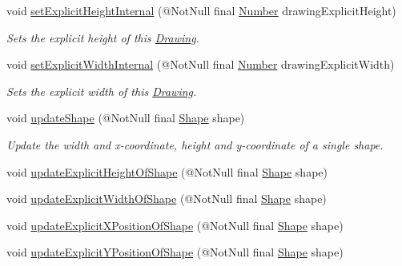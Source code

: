 \begin{DoxyCompactItemize}
void \hyperlink{classcom_1_1aarrelaakso_1_1drawl_1_1_drawing_a54f9447ef03b883cac2bf4535e777a7a}{set\+Explicit\+Height\+Internal} (@Not\+Null final \hyperlink{interfacecom_1_1aarrelaakso_1_1drawl_1_1_number}{Number} drawing\+Explicit\+Height)
\begin{DoxyCompactList}\small\item\em Sets the explicit height of this \hyperlink{classcom_1_1aarrelaakso_1_1drawl_1_1_drawing}{Drawing}. \end{DoxyCompactList}\item 
void \hyperlink{classcom_1_1aarrelaakso_1_1drawl_1_1_drawing_a7083d7046d42a99050495007854b5908}{set\+Explicit\+Width\+Internal} (@Not\+Null final \hyperlink{interfacecom_1_1aarrelaakso_1_1drawl_1_1_number}{Number} drawing\+Explicit\+Width)
\begin{DoxyCompactList}\small\item\em Sets the explicit width of this \hyperlink{classcom_1_1aarrelaakso_1_1drawl_1_1_drawing}{Drawing}. \end{DoxyCompactList}\item 
void \hyperlink{classcom_1_1aarrelaakso_1_1drawl_1_1_drawing_aa60d355859fa4dc21d2670aced9ee927}{update\+Shape} (@Not\+Null final \hyperlink{classcom_1_1aarrelaakso_1_1drawl_1_1_shape}{Shape} shape)
\begin{DoxyCompactList}\small\item\em Update the width and x-\/coordinate, height and y-\/coordinate of a single shape. \end{DoxyCompactList}\item 
void \hyperlink{classcom_1_1aarrelaakso_1_1drawl_1_1_drawing_ab55b53c2e069f28185865f5cf677c8cd}{update\+Explicit\+Height\+Of\+Shape} (@Not\+Null final \hyperlink{classcom_1_1aarrelaakso_1_1drawl_1_1_shape}{Shape} shape)
\item 
void \hyperlink{classcom_1_1aarrelaakso_1_1drawl_1_1_drawing_a5c146de66e8f3272b57322f1cee7d7d6}{update\+Explicit\+Width\+Of\+Shape} (@Not\+Null final \hyperlink{classcom_1_1aarrelaakso_1_1drawl_1_1_shape}{Shape} shape)
\item 
void \hyperlink{classcom_1_1aarrelaakso_1_1drawl_1_1_drawing_a9ae55cefe8729385c2a9cb8b9aff6763}{update\+Explicit\+X\+Position\+Of\+Shape} (@Not\+Null final \hyperlink{classcom_1_1aarrelaakso_1_1drawl_1_1_shape}{Shape} shape)
\item 
void \hyperlink{classcom_1_1aarrelaakso_1_1drawl_1_1_drawing_a52d5971daf6f95d27bcdf7650d0a9e37}{update\+Explicit\+Y\+Position\+Of\+Shape} (@Not\+Null final \hyperlink{classcom_1_1aarrelaakso_1_1drawl_1_1_shape}{Shape} shape)
\end{DoxyCompactItemize}
